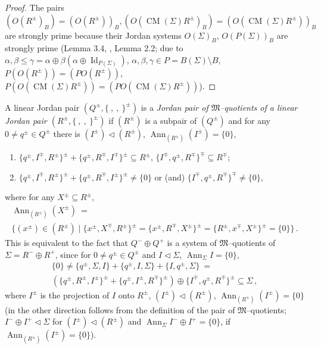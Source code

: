 \documentclass[a4paper,11pt]{article}
\DeclareMathOperator{\Id}{Id}
\DeclareMathOperator{\CM}{CM}
\DeclareMathOperator{\Ann}{Ann}
\begin{document}
\begin{proof}
The pairs ${(O(R^{\pm})_B)=(O(R^{\pm}))_B, 
(O(\CM(\Sigma) R^{\pm})_B)=(O(\CM(\Sigma) R^{\pm}))_B}$ are strongly prime 
because their 
Jordan systems $O(\Sigma)_B$, $O(P(\Sigma))_B$ are strongly prime 
(Lemma 3.4, \cite{ACLM}, Lemma 2.2; due to  
${\alpha, \beta\leq \gamma=\alpha\oplus \beta (\alpha\oplus \Id_{P(\Sigma)})}$, 
${\alpha, \beta, \gamma\in P=B(\Sigma)\setminus B}$, 
$P (O(R^{\pm}))=(P O(R^{\pm}))$, 
${P (O(\CM(\Sigma) R^{\pm}))=(P O(\CM(\Sigma) R^{\pm}))}$).
\end{proof}

A linear Jordan pair ${(Q^{\pm}, \{\ ,\ ,\ \}^{\pm})}$ is a 
\emph{Jordan pair of $\mathfrak{M}$--quotients of a linear Jordan pair 
${(R^{\pm}, \{\ ,\ ,\ \}^{\pm})}$} if ${(R^{\pm})}$ is a subpair of 
${(Q^{\pm})}$ and for any ${0\ne q^{\pm}\in Q^{\pm}}$ there is 
${(I^{\pm})\lhd (R^{\pm})}$, ${\Ann_{(R^{\pm})} (I^{\pm})=\{0\}}$, 
\begin{enumerate}

\item ${\{q^{\pm}, I^{\mp}, R^{\pm}\}^{\pm}+\{q^{\pm}, R^{\mp}, I^{\mp}\}^{\pm}
\subseteq R^{\pm}}$, ${\{I^{\mp}, q^{\pm}, R^{\mp}\}^{\mp}\subseteq R^{\mp}}$;

\item ${\{q^{\pm}, I^{\mp}, R^{\pm}\}^{\pm}+
\{q^{\pm}, R^{\mp}, I^{\pm}\}^{\pm}\ne \{0\}}$ or (and) 
${\{I^{\mp}, q^{\pm}, R^{\mp}\}^{\mp}\ne \{0\}}$, 

\end{enumerate}
where for any ${X^{\pm}\subseteq R^{\pm}}$, 
\begin{multline*}
\Ann_{(R^{\pm})} (X^{\pm})\ =
\\ 
\{(x^{\pm})\in (R^{\pm})\mid \{x^{\pm}, X^{\mp}, R^{\pm}\}^{\pm}=
\{x^{\pm}, R^{\mp}, X^{\pm}\}^{\pm}=
\{R^{\pm}, x^{\mp}, X^{\pm}\}^{\pm}=\{0\}\}\,.
\end{multline*}
This is equivalent to the fact that ${Q^{-}\oplus Q^{+}}$ is a system of 
$\mathfrak{M}$--quotients of ${\Sigma=R^{-}\oplus R^{+}}$, since for 
${0\ne q^{\pm}\in Q^{\pm}}$ and ${I\lhd \Sigma}$, ${\Ann_{\Sigma} I=\{0\}}$, 
\begin{multline*}
\{0\}\ne \{q^{\pm}, \Sigma, I\}+\{q^{\pm}, I, \Sigma\}+\{I, q^{\pm}, \Sigma\}\ =
\\
(\{q^{\pm}, R^{\pm}, I^{\pm}\}^{\pm}+\{q^{\pm}, I^{\pm}, R^{\mp}\}^{\pm})\oplus 
\{I^{\mp}, q^{\pm}, R^{\mp}\}^{\pm}\subseteq \Sigma\,,
\end{multline*}
where $I^{\pm}$ is the projection of $I$ onto $R^{\pm}$, 
${(I^{\pm})\lhd (R^{\pm})}$, ${\Ann_{(R^{\pm})} (I^{\pm})=\{0\}}$ 
(in the other direction follows from the definition of the pair 
of $\mathfrak{M}$--quotients; ${I^{-}\oplus I^{+}\lhd \Sigma}$ for 
${(I^{\pm})\lhd (R^{\pm})}$ and ${\Ann_{\Sigma} I^{-}\oplus I^{+}=\{0\}}$, 
if ${\Ann_{(R^{\pm})} (I^{\pm})=\{0\}}$). 
\end{document}

